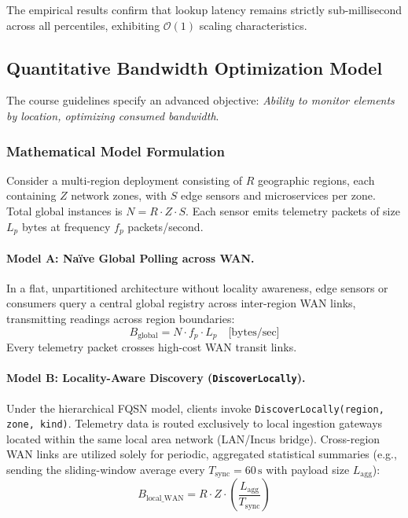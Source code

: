 The empirical results confirm that lookup latency remains strictly sub-millisecond across all percentiles, exhibiting $\mathcal{O}(1)$ scaling characteristics.

\subsection{Quantitative Bandwidth Optimization Model}
\label{sec:bandwidth}

The course guidelines specify an advanced objective: \textit{Ability to monitor elements by location, optimizing consumed bandwidth}.

\subsubsection{Mathematical Model Formulation}
Consider a multi-region deployment consisting of $R$ geographic regions, each containing $Z$ network zones, with $S$ edge sensors and microservices per zone. Total global instances is $N = R \cdot Z \cdot S$. Each sensor emits telemetry packets of size $L_p$ bytes at frequency $f_p$ packets/second.

\paragraph{Model A: Naïve Global Polling across WAN.}
In a flat, unpartitioned architecture without locality awareness, edge sensors or consumers query a central global registry across inter-region WAN links, transmitting readings across region boundaries:
\begin{equation}
    B_{\text{global}} = N \cdot f_p \cdot L_p \quad \text{[bytes/sec]}
\end{equation}
Every telemetry packet crosses high-cost WAN transit links.

\paragraph{Model B: Locality-Aware Discovery (\texttt{DiscoverLocally}).}
Under the hierarchical FQSN model, clients invoke \texttt{DiscoverLocally(region, zone, kind)}. Telemetry data is routed exclusively to local ingestion gateways located within the same local area network (LAN/Incus bridge). Cross-region WAN links are utilized solely for periodic, aggregated statistical summaries (e.g., sending the sliding-window average every $T_{\text{sync}} = 60\,\text{s}$ with payload size $L_{\text{agg}}$):
\begin{equation}
    B_{\text{local\_WAN}} = R \cdot Z \cdot \left( \frac{L_{\text{agg}}}{T_{\text{sync}}} \right)
\end{equation}

